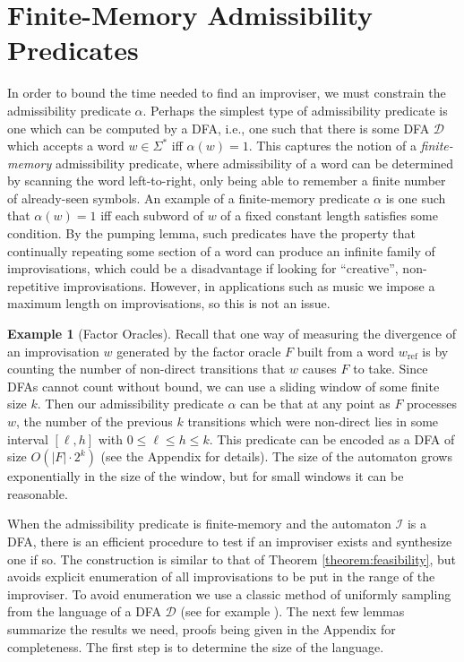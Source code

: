 \documentclass[a4paper,USenglish,numberwithinsect]{lipics}
\theoremstyle{plain}
\theoremstyle{definition}
\newtheorem{example-indexed-by-theorem}[theorem]{Example}
\newcommand{\improvs}{I}
\newcommand{\wref}{w_{\text{ref}}}
\begin{document}
\section{Finite-Memory Admissibility Predicates} \label{section:finite-memory}

In order to bound the time needed to find an improviser, we must
constrain the admissibility predicate $\alpha$. Perhaps the simplest
type of admissibility predicate is one which can be computed by a DFA,
i.e., one such that there is some DFA $\mathcal{D}$ which accepts a
word $w \in \Sigma^*$ iff $\alpha(w) = 1$. This captures the notion of
a \emph{finite-memory} admissibility predicate, where admissibility of
a word can be determined by scanning the word left-to-right, only
being able to remember a finite number of already-seen symbols. An
example of a finite-memory predicate $\alpha$ is one 
such that $\alpha(w) = 1$ iff each subword of $w$
of a fixed constant length satisfies some condition. By the
pumping lemma, such predicates have the property that continually
repeating some section of a word can produce an infinite family of
improvisations, which could be a disadvantage if looking for
``creative'', non-repetitive improvisations. However, in applications
such as music we impose a maximum length on improvisations, so this is
not an issue. 

\begin{example-indexed-by-theorem}[Factor Oracles]
Recall that one way of measuring the divergence of an improvisation
$w$ generated by the factor oracle $F$ built from a word $\wref$ is by
counting the number of non-direct transitions that $w$ causes $F$ to
take. Since DFAs cannot count without bound, we can use a sliding window of some
finite size $k$. Then our admissibility predicate $\alpha$ can be that
at any point as $F$ processes $w$, the number of the previous $k$
transitions which were non-direct lies in some interval $[\ell,h]$
with $0 \le \ell \le h \le k$. This predicate can be encoded as a DFA
of size $O(|F| \cdot 2^k)$ (see the Appendix for details). The size of
the automaton grows exponentially in the size of the window, but for
small windows it can be reasonable. 
\end{example-indexed-by-theorem}

When the admissibility predicate is finite-memory and the automaton
$\mathcal{\improvs}$ is a DFA, there is an efficient procedure to test
if an improviser exists and synthesize one if so. The construction is
similar to that of Theorem \ref{theorem:feasibility}, but avoids explicit enumeration of all
improvisations to be put in the range of the improviser. To avoid
enumeration we use a classic method of uniformly sampling from the
language of a DFA $\mathcal{D}$ (see for example
\cite{hickey-cohen,denise2006}). The next few lemmas summarize the
results we need, proofs being given in the Appendix for
completeness. The first step is to determine the size of the
language. 
\end{document}
